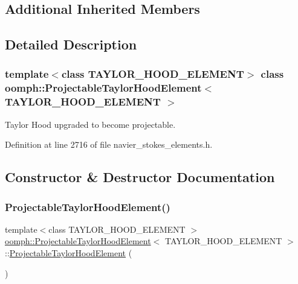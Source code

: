 \subsection*{Additional Inherited Members}


\subsection{Detailed Description}
\subsubsection*{template$<$class T\+A\+Y\+L\+O\+R\+\_\+\+H\+O\+O\+D\+\_\+\+E\+L\+E\+M\+E\+NT$>$\newline
class oomph\+::\+Projectable\+Taylor\+Hood\+Element$<$ T\+A\+Y\+L\+O\+R\+\_\+\+H\+O\+O\+D\+\_\+\+E\+L\+E\+M\+E\+N\+T $>$}

Taylor Hood upgraded to become projectable. 

Definition at line 2716 of file navier\+\_\+stokes\+\_\+elements.\+h.



\subsection{Constructor \& Destructor Documentation}
\mbox{\label{classoomph_1_1ProjectableTaylorHoodElement_ae87b1286fc74007436210e4114c0c8f1}} 
\subsubsection{\texorpdfstring{Projectable\+Taylor\+Hood\+Element()}{ProjectableTaylorHoodElement()}}
{\footnotesize\ttfamily template$<$class T\+A\+Y\+L\+O\+R\+\_\+\+H\+O\+O\+D\+\_\+\+E\+L\+E\+M\+E\+NT $>$ \\
\hyperlink{classoomph_1_1ProjectableTaylorHoodElement}{oomph\+::\+Projectable\+Taylor\+Hood\+Element}$<$ T\+A\+Y\+L\+O\+R\+\_\+\+H\+O\+O\+D\+\_\+\+E\+L\+E\+M\+E\+NT $>$\+::\hyperlink{classoomph_1_1ProjectableTaylorHoodElement}{Projectable\+Taylor\+Hood\+Element} (\begin{DoxyParamCaption}{ }\end{DoxyParamCaption})\hspace{0.3cm}{\ttfamily [inline]}}



